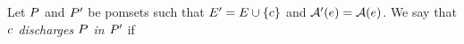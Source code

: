 \begin{definition}
  Let $P$ and $P'$ be pomsets such that 
  $E' = E \cup \{c\}$ and $\mathcal{A}'(e) = \mathcal{A}(e)$.
  We say that \emph{$c$ discharges $P$ in $P'$} if
\begin{enumerate}

\end{enumerate}
\end{definition}
